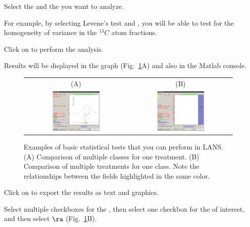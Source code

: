 \s Select the  and the  you want to analyze.

\nb
\bul For example, by selecting Levene's test and , you will be able to test for the homogeneity of variance in the ${}^{13}C$ atom fractions.

\s Click on  to perform the analysis. 

\bul Results will be displayed in the graph (Fig.~\ref{fig:lans-statistics}A) and also in the Matlab console.

\begin{figure}[!th]
\centering
\begin{tabular}{cc}
(A) & (B) \\
\includegraphics[width=0.48\textwidth, valign=t]{figs3/LANS-statistics1}
&
\includegraphics[width=0.48\textwidth, valign=t]{figs3/LANS-statistics2}
\end{tabular}
\caption{\label{fig:lans-statistics}%
Examples of basic statistical tests that you can perform in LANS. (A) Comparison of multiple classes for one treatment. (B) Comparison of multiple treatments for one class. Note the relationships between the fields highlighted in the same color.}
\end{figure}

\s Click on  to export the results as text and graphics.


\s Select multiple checkboxes for the , then select one checkbox for the  of interest,  and then select  $\ra$  (Fig.~\ref{fig:lans-statistics}B).

